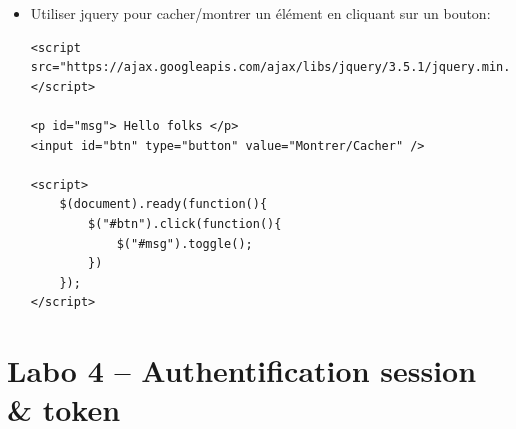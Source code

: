 \documentclass[a4paper]{article}
\begin{document}
\begin{itemize}
\item Utiliser jquery pour cacher/montrer un élément en cliquant sur un bouton:
\begin{lstlisting}[style=javascript]
<script src="https://ajax.googleapis.com/ajax/libs/jquery/3.5.1/jquery.min.js">
</script>

<p id="msg"> Hello folks </p>
<input id="btn" type="button" value="Montrer/Cacher" />

<script>
    $(document).ready(function(){
        $("#btn").click(function(){
            $("#msg").toggle();
        })
    });
</script>
\end{lstlisting}


\end{itemize}















\section{Labo 4 -- Authentification session \& token}
\end{document}
